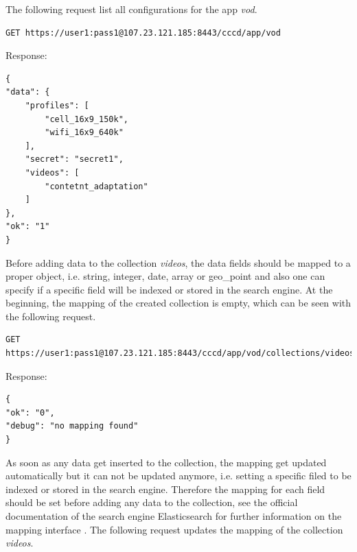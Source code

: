 The following request list all configurations for the app \textit{vod}.

\begin{code}
\begin{verbatim}
GET https://user1:pass1@107.23.121.185:8443/cccd/app/vod
\end{verbatim}
Response:
\begin{verbatim}
{
"data": {
	"profiles": [
		"cell_16x9_150k",
		"wifi_16x9_640k"
	],
	"secret": "secret1",
	"videos": [
		"contetnt_adaptation"
	]
},
"ok": "1"
}
\end{verbatim}
\end{code}

Before adding data to the collection \textit{videos}, the data fields should be mapped to a proper object, i.e. string, integer, date, array or geo\_point and also one can specify if a specific field will be indexed or stored in the search engine. At the beginning, the mapping of the created collection is empty, which can be seen with the following request.

\begin{code}
\begin{verbatim}
GET https://user1:pass1@107.23.121.185:8443/cccd/app/vod/collections/videos/mapping
\end{verbatim}
Response:
\begin{verbatim}
{
"ok": "0",
"debug": "no mapping found"
}
\end{verbatim}
\end{code}

As soon as any data get inserted to the collection, the mapping get updated automatically but it can not be updated anymore, i.e. setting a specific filed to be indexed or stored in the search engine. Therefore the mapping for each field should be set before adding any data to the collection, see the official documentation of the search engine Elasticsearch for further information on the mapping interface \cite{elastic_mapping}. The following request updates the mapping of the collection \textit{videos}.

